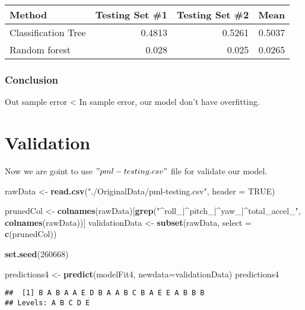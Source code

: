 \documentclass[]{article}
\newenvironment{Shaded}{\begin{snugshade}}{\end{snugshade}}
\newcommand{\KeywordTok}[1]{\textcolor[rgb]{0.13,0.29,0.53}{\textbf{{#1}}}}
\newcommand{\DataTypeTok}[1]{\textcolor[rgb]{0.13,0.29,0.53}{{#1}}}
\newcommand{\DecValTok}[1]{\textcolor[rgb]{0.00,0.00,0.81}{{#1}}}
\newcommand{\StringTok}[1]{\textcolor[rgb]{0.31,0.60,0.02}{{#1}}}
\newcommand{\OtherTok}[1]{\textcolor[rgb]{0.56,0.35,0.01}{{#1}}}
\newcommand{\NormalTok}[1]{{#1}}
\begin{document}
\begin{longtable}[c]{@{}lrrr@{}}
\toprule
Method & Testing Set \#1 & Testing Set \#2 & Mean\tabularnewline
\midrule
\endhead
Classification Tree & 0.4813 & 0.5261 & 0.5037\tabularnewline
Random forest & 0.028 & 0.025 & 0.0265\tabularnewline
\bottomrule
\end{longtable}

\subsubsection{Conclusion}\label{conclusion}

Out sample error \textless{} In sample error, our model don't have
overfitting.

\section{Validation}\label{validation}

Now we are goint to use \("pml-testing.csv"\) file for validate our
model.

\begin{Shaded}
\begin{Highlighting}[]
\NormalTok{rawData <-}\StringTok{ }\KeywordTok{read.csv}\NormalTok{(}\StringTok{"./OriginalData/pml-testing.csv"}\NormalTok{, }\DataTypeTok{header =} \OtherTok{TRUE}\NormalTok{)}
\end{Highlighting}
\end{Shaded}

\begin{Shaded}
\begin{Highlighting}[]
\NormalTok{prunedCol <-}\StringTok{ }\KeywordTok{colnames}\NormalTok{(rawData)[}\KeywordTok{grep}\NormalTok{(}\StringTok{"^roll_|^pitch_|^yaw_|^total_accel_"}\NormalTok{,}
                                    \KeywordTok{colnames}\NormalTok{(rawData))]}
\NormalTok{validationData <-}\StringTok{ }\KeywordTok{subset}\NormalTok{(rawData, }\DataTypeTok{select =} \KeywordTok{c}\NormalTok{(prunedCol))}
\end{Highlighting}
\end{Shaded}

\begin{Shaded}
\begin{Highlighting}[]
\KeywordTok{set.seed}\NormalTok{(}\DecValTok{260668}\NormalTok{)}

\NormalTok{predictions4 <-}\StringTok{ }\KeywordTok{predict}\NormalTok{(modelFit4, }\DataTypeTok{newdata=}\NormalTok{validationData)}
\NormalTok{predictions4}
\end{Highlighting}
\end{Shaded}

\begin{verbatim}
##  [1] B A B A A E D B A A B C B A E E A B B B
## Levels: A B C D E
\end{verbatim}
\end{document}
